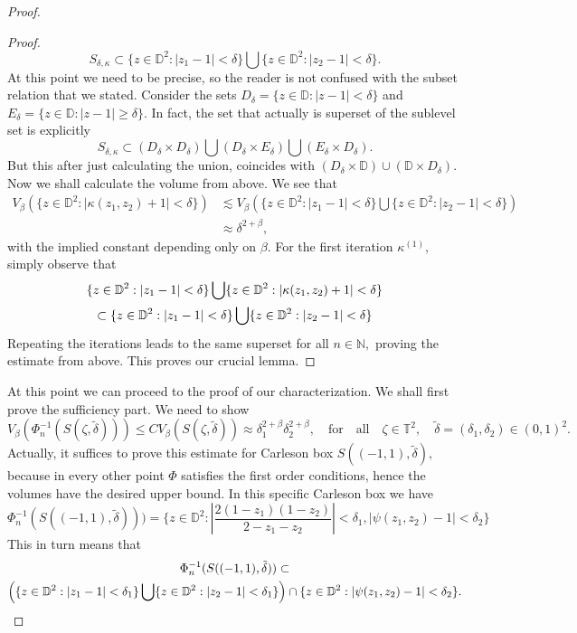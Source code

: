\documentclass[12pt]{amsart}
\numberwithin{equation}{section}
\begin{document}
\begin{proof}
\begin{proof}
$$S_{\delta,\kappa}\subset\{z\in\mathbb{D}^2:|z_1-1|<\delta\}\bigcup\{z\in \mathbb{D}^2:|z_2-1|<\delta\}.$$ At this point we need to be precise, so the reader is not confused with the subset relation that we stated. Consider the sets $D_{\delta}=\{z\in\mathbb{D}:|z-1|<\delta\}$ and $E_{\delta}=\{z\in\mathbb{D}:|z-1|\ge\delta\}.$
In fact, the set that actually is superset of the sublevel set is explicitly $$S_{\delta,\kappa}\subset (D_{\delta}\times D_{\delta})\bigcup(D_{\delta}\times E_{\delta})\bigcup(E_{\delta}\times D_{\delta}).$$
But this after just calculating the union, coincides with $(D_{\delta}\times\mathbb{D})\cup (\mathbb{D}\times D_{\delta}).$
Now we shall calculate the volume from above. We see that 
\begin{align}
V_{\beta}(\{z\in\mathbb{D}^2:|\kappa(z_1,z_2)+1|<\delta\})&\lesssim V_{\beta}\left(\{z\in \mathbb{D}^2: |z_1-1|<\delta\}\bigcup\{z\in \mathbb{D}^2:|z_2-1|<\delta\}\right)&&\\ &\approx \delta^{2+\beta},
\end{align}
with the implied constant depending only on $\beta.$ For the first iteration $\kappa^{(1)},$ simply observe that 
\begin{multline}\{z\in\mathbb{D}^2:|z_1-1|<\delta\}\bigcup\{z\in \mathbb{D}^2:|\kappa(z_1,z_2)+1|<\delta\}\\\subset\{z\in \mathbb{D}^2: |z_1-1|<\delta\}\bigcup\{z\in \mathbb{D}^2:|z_2-1|<\delta\} \notag 
\end{multline}
Repeating the iterations leads to the same superset for all $n\in\mathbb{N},$ proving the estimate from above. This proves our crucial lemma.
\end{proof}
At this point we can proceed to the proof of our characterization.
We shall first prove the sufficiency part. We need to show
$$V_{\beta}(\Phi_n^{-1}(S(\zeta,\tilde{\delta})))\leq CV_{\beta}(S(\zeta,\tilde{\delta}))\approx\delta_1^{2+\beta}\delta_2^{2+\beta},\quad \mathrm{for}\quad \mathrm{all}\quad \zeta\in\mathbb{T}^2,\quad \tilde{\delta}=(\delta_1,\delta_2)\in(0,1)^2.$$
Actually, it suffices to prove this estimate for Carleson box $S((-1,1),\tilde{\delta}),$ because in every other point $\Phi$ satisfies the first order conditions, hence the volumes have the desired upper bound. In this specific Carleson box we have
$$\Phi^{-1}_n(S((-1,1),\tilde{\delta})))=\Bigg\{z\in\mathbb{D}^2:\left|\frac{2(1-z_1)(1-z_2)}{2-z_1-z_2}\right|<\delta_1,|\psi(z_1,z_2)-1|<\delta_2 \Bigg\}$$
This in turn means that 
\begin{multline}
\Phi_n^{-1}(S((-1,1),\tilde{\delta}))\subset\\\left(\{z\in\mathbb{D}^2:|z_1-1|<\delta_1\}\bigcup\{z\in \mathbb{D}^2:|z_2-1|<\delta_1\}\right)\cap\{z\in \mathbb{D}^2:|\psi(z_1,z_2)-1|<\delta_2\}. \notag

\end{multline}
\end{proof}
\end{document}
